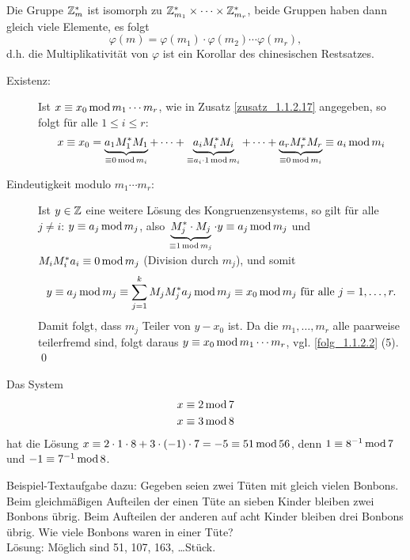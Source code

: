 \begin{zusatz}
\label{zusatz_1.1.2.18}
	Die Gruppe $\mathbb{Z}_m^*$ ist isomorph zu $\mathbb{Z}_{m_1}^* \times \dots \times \mathbb{Z}_{m_r}^*$, beide Gruppen haben dann gleich viele Elemente, es folgt
	\[ \varphi(m) = \varphi(m_1) \cdot \varphi(m_2) \cdots \varphi(m_r), \]
	d.h. die Multiplikativität von $\varphi$ ist ein Korollar des chinesischen Restsatzes.
\end{zusatz}

	\begin{description}
		\item[Existenz:] Ist $x \equiv x_0 \operatorname{mod} m_1 \cdots m_r$, wie in Zusatz \ref{zusatz_1.1.2.17} angegeben, so folgt für alle $1 \leq i \leq r$:
		\[ x \equiv x_0 = \underbrace{a_1 M_1^* M_1}_{\equiv 0 \operatorname{mod} m_i} + \dots + \underbrace{a_i M_i^* M_i}_{\equiv a_i \cdot 1 \operatorname{mod} m_i} + \dots + \underbrace{a_r M_r^* M_r}_{\equiv 0 \operatorname{mod} m_i} \equiv a_i \operatorname{mod} m_i \]
		\item[Eindeutigkeit modulo $m_1 \cdots m_r$:] Ist $y \in \mathbb{Z}$ eine weitere Lösung des Kongruenzensystems, so gilt für alle $j \neq i$: $y \equiv a_j \operatorname{mod} m_j$, also $\underbrace{M_j^* \cdot M_j}_{\equiv 1 \operatorname{mod} m_j} \cdot y \equiv a_j \operatorname{mod} m_j$ und $M_i M_i^* a_i \equiv 0 \operatorname{mod} m_j$ (Division durch $m_j$), und somit
		\[ y \equiv a_j \operatorname{mod} m_j \equiv \sum_{j=1}^{k} M_j M_j^* a_j \operatorname{mod} m_j \equiv x_0 \operatorname{mod} m_j \text{ für alle } j=1,\dots,r. \]
		Damit folgt, dass $m_j$ Teiler von $y-x_0$ ist. Da die $m_1, \dots, m_r$ alle paarweise teilerfremd sind, folgt daraus $y \equiv x_0 \operatorname{mod} m_1 \cdots m_r$, vgl. \ref{folg_1.1.2.2} (5). \qed
	\end{description}
	
	Das System
	\begin{equation}
	\begin{aligned}
		x \equiv 2 \operatorname{mod} 7 \\
		x \equiv 3 \operatorname{mod} 8
	\end{aligned}
	\end{equation}
	hat die Lösung $x \equiv 2 \cdot 1 \cdot 8 + 3 \cdot (-1) \cdot 7 = -5 \equiv 51 \operatorname{mod} 56$, denn $1 \equiv 8^{-1} \operatorname{mod} 7$ und $-1 \equiv 7^{-1} \operatorname{mod} 8$.
	
	Beispiel-Textaufgabe dazu: Gegeben seien zwei Tüten mit gleich vielen Bonbons. Beim gleichmäßigen Aufteilen der einen Tüte an sieben Kinder bleiben zwei Bonbons übrig. Beim Aufteilen der anderen auf acht Kinder bleiben drei Bonbons übrig. Wie viele Bonbons waren in einer Tüte? \\
	Lösung: Möglich sind 51, 107, 163, \dots Stück. 
	
